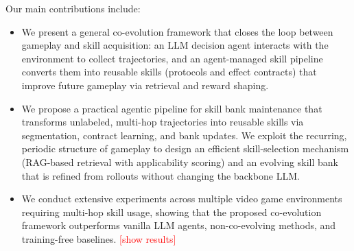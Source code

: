 Our main contributions include:
\begin{itemize}
    \item We present a general co-evolution framework that closes the loop between gameplay and skill acquisition: an LLM decision agent interacts with the environment to collect trajectories, and an agent-managed skill pipeline converts them into reusable skills (protocols and effect contracts) that improve future gameplay via retrieval and reward shaping.
    \item We propose a practical agentic pipeline for skill bank maintenance that transforms unlabeled, multi-hop trajectories into reusable skills via segmentation, contract learning, and bank updates. We exploit the recurring, periodic structure of gameplay to design an efficient skill-selection mechanism (RAG-based retrieval with applicability scoring) and an evolving skill bank that is refined from rollouts without changing the backbone LLM.
    \item We conduct extensive experiments across multiple video game environments requiring multi-hop skill usage, showing that the proposed co-evolution framework outperforms vanilla LLM agents, non-co-evolving methods, and training-free baselines. \textcolor{red}{[show results]}
\end{itemize}
